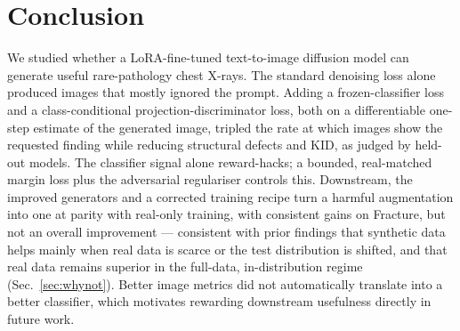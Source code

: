 \documentclass[twoside,english]{article}
\begin{document}
\section{Conclusion}\label{sec:conclusion}
We studied whether a LoRA-fine-tuned text-to-image diffusion model can generate useful rare-pathology chest X-rays. The standard denoising loss alone produced images that mostly ignored the prompt. Adding a frozen-classifier loss and a class-conditional projection-discriminator loss, both on a differentiable one-step estimate of the generated image, tripled the rate at which images show the requested finding while reducing structural defects and KID, as judged by held-out models. The classifier signal alone reward-hacks; a bounded, real-matched margin loss plus the adversarial regulariser controls this. Downstream, the improved generators and a corrected training recipe turn a harmful augmentation into one at parity with real-only training, with consistent gains on Fracture, but not an overall improvement --- consistent with prior findings that synthetic data helps mainly when real data is scarce or the test distribution is shifted, and that real data remains superior in the full-data, in-distribution regime (Sec.~\ref{sec:whynot}). Better image metrics did not automatically translate into a better classifier, which motivates rewarding downstream usefulness directly in future work.



\end{document}
